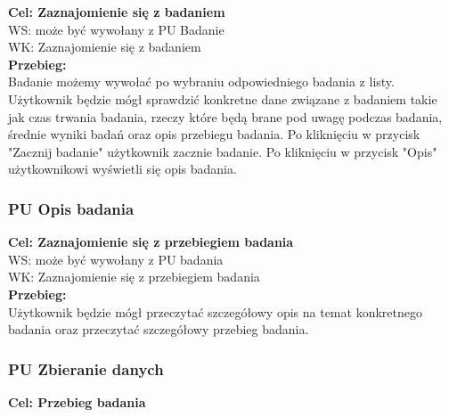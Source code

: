 \documentclass[12pt, letterpaper]{article}
\begin{document}
		\quad
		
		\textbf{Cel: Zaznajomienie się z badaniem}\\
		
		WS: może być wywołany z PU Badanie\\
		
		WK: Zaznajomienie się z badaniem\\
		
		\textbf{Przebieg: }\\
		Badanie możemy wywołać po wybraniu odpowiedniego badania z listy. Użytkownik będzie mógł sprawdzić konkretne dane związane z badaniem takie jak czas trwania badania, rzeczy które będą brane pod uwagę podczas badania, średnie wyniki badań oraz opis przebiegu badania. Po kliknięciu w przycisk "Zacznij badanie" użytkownik zacznie badanie. Po kliknięciu w przycisk "Opis" użytkownikowi wyświetli się opis badania.
		 \\
		 
		
		\subsubsection{PU Opis badania}
		
		\quad
		
		\textbf{Cel: Zaznajomienie się z przebiegiem badania}\\
		
		WS: może być wywołany z PU badania\\
		
		WK: Zaznajomienie się z przebiegiem badania\\
		
		\textbf{Przebieg: }\\
		Użytkownik będzie mógł przeczytać szczegółowy opis na temat konkretnego badania oraz przeczytać szczegółowy przebieg badania.
		 \\
		 
		
		\subsubsection{PU Zbieranie danych}
		
		\quad
		
		\textbf{Cel: Przebieg badania}\\
		
\end{document}
